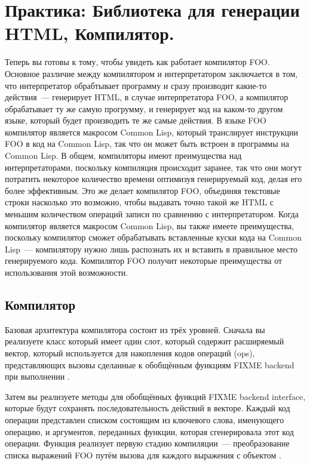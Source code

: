 \chapter{Практика: Библиотека для генерации HTML, Компилятор.}
\label{ch:31}

Теперь вы готовы к тому, чтобы увидеть как работает компилятор FOO. Основное различие
между компилятором и интерпретатором заключается в том, что интерпретатор обрабтывает
программу и сразу производит какие-то действия~--- генерирует HTML, в случае интерпретатора
FOO, а компилятор обрабатывает ту же самую прогрумму, и генерирует код на каком-то другом
языке, который будет производить те же самые действия.  В языке FOO компилятор является
макросом Common Lisp, который транслирует инструкции FOO в код на Common Lisp, так что он
может быть встроен в программы на Common Lisp. В общем, компиляторы имеют преимущества над
интерпретаторами, поскольку компиляция происходит заранее, так что они могут потратить
некоторое количество времени оптимизуя генерируемый код, делая его более эффективным.  Это
же делает компилятор FOO, объединяя текстовые строки насколько это возможно, чтобы
выдавать точно такой же HTML с меньшим количеством операций записи по сравнению с
интерпретатором.  Когда компилятор является макросом Common Lisp, вы также имеете
преимущества, поскольку компилятор сможет обрабатывать вставленные куски кода на Common
Lisp~--- компилятору нужно лишь распознать их и вставить в правильное место генерируемого
кода.  Компилятор FOO получит некоторые преимущества от использования этой возможности.

\section{Компилятор}

Базовая архитектура компилятора состоит из трёх уровней.  Сначала вы реализуете класс
 который имеет один слот, который содержит расширяемый вектор, который
используется для накопления кодов операций (ops), представляющих вызовы сделанные к
обобщённым функциям FIXME backend при выполнении .

Затем вы реализуете методы для обобщённых функций FIXME backend interface, которые будут
сохранять последовательность действий в векторе.  Каждый код операции представлен списком
состоящим из ключевого слова, именующего операцию, и аргументов, переданных функции,
которая сгенерировала этот код операции.  Функция  реализует первую стадию
компиляции~--- преобразование списка выражений FOO путём вызова  для каждого
выражения с объектом .

